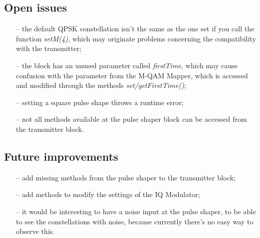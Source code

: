 \subsection*{Open issues}
\begin{itemize}
  \item[--] the default QPSK constellation isn't the same as the one set if you call the function \textit{setM(4)}, which may originate problems concerning the compatibility with the transmitter;
  \item[--] the block has an unused parameter called \textit{firstTime}, which may cause confusion with the parameter from the M-QAM Mapper, which is accessed and modified through the methods \textit{set/getFirstTime()};
  \item[--] setting a square pulse shape throws a runtime error;
  \item[--] not all methods available at the pulse shaper block can be accessed from the transmitter block.
\end{itemize}
\subsection*{Future improvements}
\begin{itemize}
  \item[--] add missing methods from the pulse shaper to the transmitter block;
  \item[--] add methods to modify the settings of the IQ Modulator;
  \item[--] it would be interesting to have a noise input at the pulse shaper, to be able to see the constellations with noise, because currently there's no easy way to observe this.
\end{itemize}

